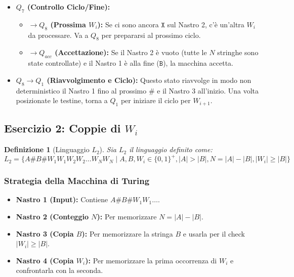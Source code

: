 \documentclass[a4paper]{article}
\newtheorem{definition}{Definizione}
\newcommand{\B}{\texttt{B}} %
\newcommand{\Sh}{\texttt{\#}} %
\newcommand{\X}{\texttt{X}} %
\begin{document}
\begin{itemize}
    \item \textbf{$Q_7$ (Controllo Ciclo/Fine):}
        \begin{itemize}
            \item \textbf{$\to Q_8$ (Prossima $W_i$):} Se ci sono ancora $\X$ sul Nastro 2, c'è un'altra $W_i$ da processare. Va a $Q_8$ per prepararsi al prossimo ciclo.
            \item \textbf{$\to Q_{acc}$ (Accettazione):} Se il Nastro 2 è vuoto (tutte le $N$ stringhe sono state controllate) e il Nastro 1 è alla fine ($\B$), la macchina accetta.
        \end{itemize}
    \item \textbf{$Q_8 \to Q_1$ (Riavvolgimento e Ciclo):} Questo stato riavvolge in modo non deterministico il Nastro 1 fino al prossimo $\Sh$ e il Nastro 3 all'inizio. Una volta posizionate le testine, torna a $Q_1$ per iniziare il ciclo per $W_{i+1}$.
\end{itemize}


\subsection{Esercizio 2: Coppie di $W_i$}

\begin{definition}[Linguaggio $L_2$]
Sia $L_2$ il linguaggio definito come:
\[
L_2 = \{ A\Sh B\Sh W_1 W_1 W_2 W_2 \dots W_N W_N \mid A, B, W_i \in \{0,1\}^+, |A| > |B|, N = |A| - |B|, |W_i| \ge |B| \}
\]
\end{definition}

\subsubsection{Strategia della Macchina di Turing}
\begin{itemize}
    \item \textbf{Nastro 1 (Input):} Contiene $A\Sh B\Sh W_1 W_1 \dots$.
    \item \textbf{Nastro 2 (Conteggio $N$):} Per memorizzare $N = |A| - |B|$.
    \item \textbf{Nastro 3 (Copia $B$):} Per memorizzare la stringa $B$ e usarla per il check $|W_i| \ge |B|$.
    \item \textbf{Nastro 4 (Copia $W_i$):} Per memorizzare la prima occorrenza di $W_i$ e confrontarla con la seconda.
\end{itemize}
\end{document}

